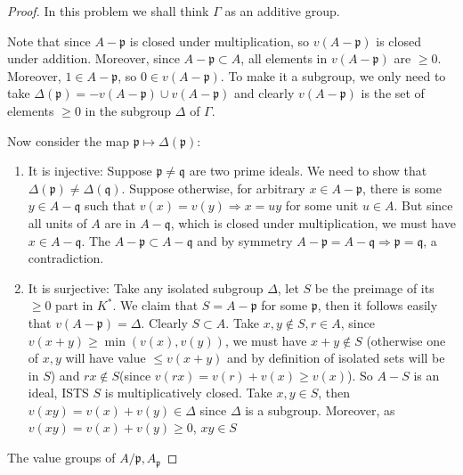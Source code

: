 \documentclass{solution}
\begin{document}
\begin{proof}
    In this problem we shall think $\Gamma$ as an additive group.

    Note that since $A - \mathfrak{p}$ is closed under multiplication, so $v(A  -\mathfrak{p})$ is closed under addition. Moreover, since $A - \mathfrak{p} \subset A$, all elements in $v(A - \mathfrak{p})$ are $\ge 0$. Moreover, $1 \in A - \mathfrak{p}$, so $0 \in v(A - \mathfrak{p})$. To make it a subgroup, we only need to take $\Delta(\mathfrak{p}) = -v(A - \mathfrak{p}) \cup v(A - \mathfrak{p})$ and clearly $v(A - \mathfrak{p})$ is the set of elements $\ge 0$ in the subgroup $\Delta$ of $\Gamma$.

    Now consider the map $\mathfrak{p} \mapsto \Delta(\mathfrak{p})$:
    \begin{enumerate}
        \item It is injective: Suppose $\mathfrak{p} \ne \mathfrak{q}$ are two prime ideals. We need to show that $\Delta(\mathfrak{p}) \ne \Delta(\mathfrak{q})$. Suppose otherwise, for arbitrary $x \in A - \mathfrak{p}$, there is some $y \in A - \mathfrak{q}$ such that $v(x) = v(y) \Rightarrow x = uy$ for some unit $u \in A$. But since all units of $A$ are in $A - \mathfrak{q}$, which is closed under multiplication, we must have $x \in A - \mathfrak{q}$. The $A - \mathfrak{p} \subset A - \mathfrak{q}$ and by symmetry $A - \mathfrak{p} = A - \mathfrak{q} \Rightarrow \mathfrak{p} = \mathfrak{q}$, a contradiction.
        \item It is surjective: Take any isolated subgroup $\Delta$, let $S$ be the preimage of its $\ge 0$ part in $K^*$. We claim that $S = A - \mathfrak{p}$ for some $\mathfrak{p}$, then it follows easily that $v(A - \mathfrak{p}) = \Delta$. Clearly $S \subset A$. Take $x, y \notin S, r \in A$, since $v(x + y) \ge \min (v(x), v(y))$, we must have $x + y \notin S$ (otherwise one of $x, y$ will have value $\le v(x + y)$ and by definition of isolated sets will be in $S$) and $rx \notin S$(since $v(rx) = v(r) + v(x) \ge v(x)$). So $A - S$ is an ideal, ISTS $S$ is multiplicatively closed. Take $x, y \in S$, then $v(xy) = v(x) + v(y) \in \Delta$ since $\Delta$ is a subgroup. Moreover, as $v(xy) = v(x) + v(y) \ge 0$, $xy \in S$
    \end{enumerate}

    \TODO The value groups of $A / \mathfrak{p}, A_{\mathfrak{p}}$
\end{proof}
\end{document}
